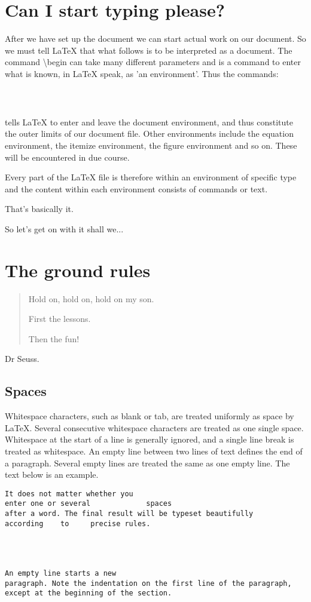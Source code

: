 \pagebreak
\section{Can I start typing please?}

After we have set up the document we can start actual work on our document. So we must tell LaTeX that what follows is to be interpreted as a document.  The command {\textbackslash}begin can take many different parameters and is a command to enter what is known, in LaTeX speak, as 'an environment'. Thus the commands:
\begin{verbatim}



\end{verbatim}

tells LaTeX to enter and leave the document environment, and thus constitute the outer limits of our document file. Other environments include the equation environment, the itemize environment, the figure environment and so on. These will be encountered in due course.

Every part of the LaTeX file is therefore within an environment of specific type and the content within each environment consists of commands or text.

That's basically it.

So let's get on with it shall we...

\pagebreak
\section{The ground rules}
\begin{quote}
Hold on, hold on, hold on my son.

First the lessons.

Then the fun!
\end{quote}
Dr Seuss.

\subsection{Spaces}
Whitespace characters, such as blank or tab, are treated uniformly as space by LaTeX. Several consecutive whitespace characters are treated as one single space. Whitespace at the start of a line is generally ignored, and a single line break is treated as whitespace. An empty line between two lines of text defines the end of a paragraph. Several empty lines are treated the same as one empty line. The text below is an example.

\begin{verbatim}
It does not matter whether you
enter one or several             spaces
after a word. The final result will be typeset beautifully
according    to     precise rules.




An empty line starts a new
paragraph. Note the indentation on the first line of the paragraph, 
except at the beginning of the section. 
\end{verbatim}

